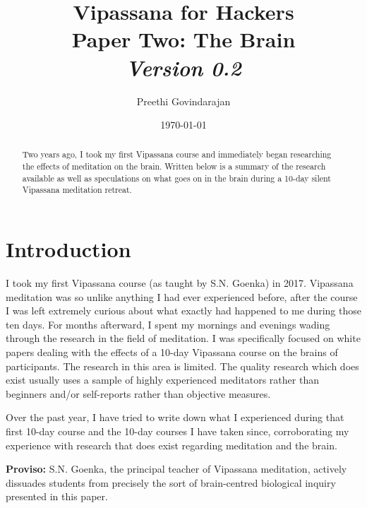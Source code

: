 \documentclass[a4paper, amsfonts, amssymb, amsmath, reprint, showkeys, nofootinbib, twoside]{revtex4-1}
\begin{document}
\title{%
  \Huge{Vipassana for Hackers} \\
  \large{Paper Two: The Brain} \\
  \large\textit{Version 0.2}
}
\author{Preethi Govindarajan}
\date{\today}

\begin{abstract}
  Two years ago, I took my first Vipassana course and immediately began researching 
the effects of meditation on the brain. Written below is a summary of the research 
available as well as speculations on what goes on in the brain during a 10-day silent 
Vipassana meditation retreat.
\end{abstract}


\maketitle

\listoftodos

\section{Introduction}

I took my first Vipassana course (as taught by S.N. Goenka) in 2017. 
Vipassana meditation was so unlike anything I had ever experienced before, 
after the course I was left extremely curious about what exactly had happened 
to me during those ten days. For months afterward, I spent my mornings and 
evenings wading through the research in the field of meditation. I was specifically 
focused on white papers dealing with the effects of a 10-day Vipassana course on 
the brains of participants. The research in this area is limited. 
The quality research which does exist usually uses a sample of highly 
experienced meditators \cite{tibeteanmonks} rather than beginners and/or self-reports rather than
objective measures.

Over the past year, I have tried to write down what I experienced during that first
10-day course and the 10-day courses I have taken since, corroborating my experience
with research that does exist regarding meditation and the brain.

\textbf{Proviso:} S.N. Goenka, the principal teacher of Vipassana meditation,
actively dissuades students from precisely the sort of brain-centred biological
inquiry presented in this paper.
\end{document}
